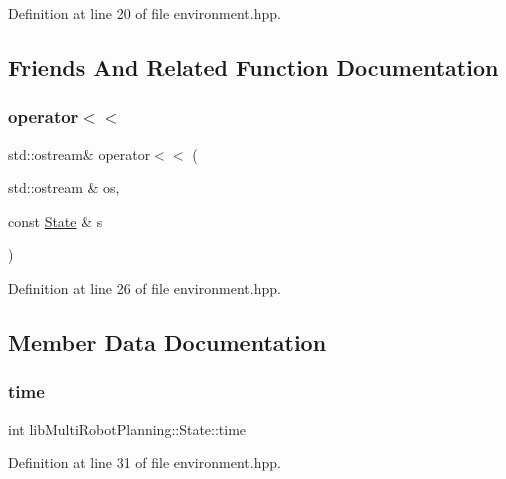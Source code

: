 Definition at line 20 of file environment.\+hpp.



\subsection{Friends And Related Function Documentation}
\mbox{\label{structlib_multi_robot_planning_1_1_state_a5604754e63c801276d20313c05a68847}} 
\subsubsection{\texorpdfstring{operator$<$$<$}{operator<<}}
{\footnotesize\ttfamily std\+::ostream\& operator$<$$<$ (\begin{DoxyParamCaption}\item[{std\+::ostream \&}]{os,  }\item[{const \hyperlink{structlib_multi_robot_planning_1_1_state}{State} \&}]{s }\end{DoxyParamCaption})\hspace{0.3cm}{\ttfamily [friend]}}



Definition at line 26 of file environment.\+hpp.



\subsection{Member Data Documentation}
\mbox{\label{structlib_multi_robot_planning_1_1_state_aa17a0558cc7338969be67626bd17082a}} 
\subsubsection{\texorpdfstring{time}{time}}
{\footnotesize\ttfamily int lib\+Multi\+Robot\+Planning\+::\+State\+::time}



Definition at line 31 of file environment.\+hpp.

